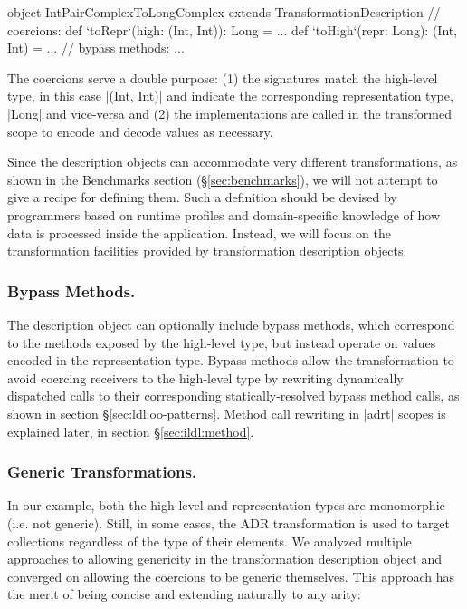 \begin{lstlisting-nobreak}
object IntPairComplexToLongComplex
          extends TransformationDescription {
  // coercions:
  def `toRepr`(high: (Int, Int)): Long = ...
  def `toHigh`(repr: Long): (Int, Int) = ...
  // bypass methods:
  ...
}
\end{lstlisting-nobreak}

The coercions serve a double purpose: (1) the signatures match the high-level type, in this case |(Int, Int)| and indicate the corresponding representation type, |Long| and vice-versa and (2) the implementations are called in the transformed scope to encode and decode values as necessary.

Since the description objects can accommodate very different transformations, as shown in the Benchmarks section (\S\ref{sec:benchmarks}), we will not attempt to give a recipe for defining them. Such a definition should be devised by programmers based on runtime profiles and domain-specific knowledge of how data is processed inside the application. Instead, we will focus on the transformation facilities provided by transformation description objects.

\subsubsection{Bypass Methods.} The description object can optionally include bypass methods, which correspond to the methods exposed by the high-level type, but instead operate on values encoded in the representation type. Bypass methods allow the transformation to avoid coercing receivers to the high-level type by rewriting dynamically dispatched calls to their corresponding statically-resolved bypass method calls, as shown in section \S\ref{sec:ldl:oo-patterns}. Method call rewriting in |adrt| scopes is explained later, in section \S\ref{sec:ildl:method}.

\subsubsection{Generic Transformations.} In our example, both the high-level and representation types are monomorphic (i.e. not generic). Still, in some cases, the ADR transformation is used to target collections regardless of the type of their elements. We analyzed multiple approaches to allowing genericity in the transformation description object and converged on allowing the coercions to be generic themselves. This approach has the merit of being concise and extending naturally to any arity:

